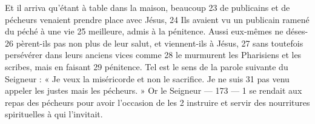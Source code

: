 Et il arriva qu'étant à table dans la maison, beaucoup	 
23	 	de publicains et de pécheurs venaient prendre place avec Jésus,	 
24	 	Ils avaient vu un publicain ramené du péché à une vie	 
25	 	meilleure, admis à la pénitence. Aussi eux-mêmes ne déses-	 
26	 	pèrent-ils pas non plus de leur salut, et viennent-ils à Jésus,	 
27	 	sans toutefois persévérer dans leurs anciens vices comme	 
28	 	le murmurent les Pharisiens et les scribes, mais en faisant	 
29	 	pénitence. Tel est le sens de la parole suivante du Seigneur :
« Je veux la miséricorde et non le sacrifice. Je ne suis	 
31	 	pas venu appeler les justes mais les pécheurs. » Or le Seigneur	 
 	--- 173 ---	 
1	 	se rendait aux repas des pécheurs pour avoir l'occasion de les	 
2	 	instruire et servir des nourritures spirituelles à qui l'invitait.
